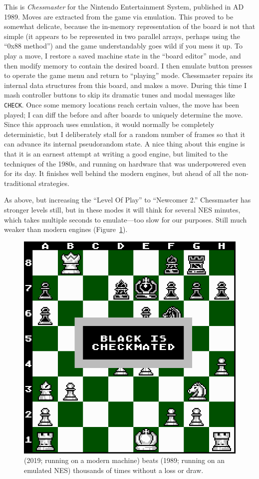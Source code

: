 \documentclass[10pt,preprint,twocolumn]{acmart}
\begin{document}
 This is {\it Chessmaster} for
the Nintendo Entertainment System, published in AD 1989. Moves are
extracted from the game via emulation. This proved to be somewhat
delicate, because the in-memory representation of the board is not
that simple (it appears to be represented in two parallel arrays,
perhaps using the ``0x88 method'') and the game understandably goes
wild if you mess it up. To play a move, I restore a saved machine
state in the ``board editor'' mode, and then modify memory to contain
the desired board. I then emulate button presses to operate the game
menu and return to ``playing'' mode. Chessmaster repairs its internal
data structures from this board, and makes a move. During this time I
mash controller buttons to skip its dramatic tunes and modal messages
like \verb+CHECK+. Once some memory locations reach certain values,
the move has been played; I can diff the before and after boards to
uniquely determine the move. Since this approach uses emulation, it
would normally be completely deterministic, but I deliberately stall
for a random number of frames so that it can advance its internal
pseudorandom state. A nice thing about this engine is that it is an
earnest attempt at writing a good engine, but limited to the
techniques of the 1980s, and running on hardware that was underpowered
even for its day. It finishes well behind the modern engines, but
ahead of all the non-traditional strategies. \traditional

 As above, but increasing the
``Level Of Play'' to ``Newcomer 2.'' Chessmaster has stronger levels
still, but in these modes it will think for several NES minutes, which
takes multiple seconds to emulate---too slow for our purposes. Still
much weaker than modern engines (Figure~\ref{fig:chessmaster}).
\traditional

\begin{figure}[ht]
  \includegraphics[width=0.75 \linewidth]{chessmaster}
  \caption{ (2019; running on a modern machine) beats
     (1989; running on an emulated NES)
    thousands of times without a loss or draw.} \label{fig:chessmaster}
\end{figure}
\end{document}
